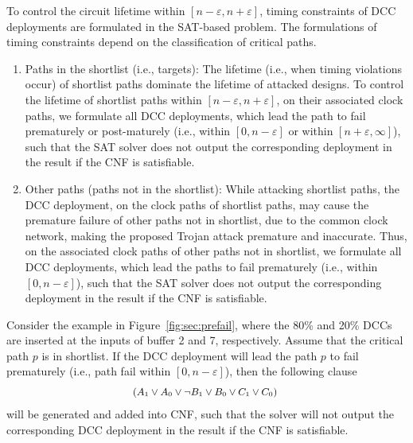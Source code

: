 To control the circuit lifetime within $[n - \varepsilon, n + \varepsilon]$, timing constraints of DCC deployments are formulated in the SAT-based problem. The formulations of timing constraints depend on the classification of critical paths.
\begin{enumerate}
	\item Paths in the shortlist (i.e., targets): The lifetime (i.e., when timing violations occur) of shortlist paths dominate the lifetime of attacked designs. To control the lifetime of shortlist paths within $[n - \varepsilon, n + \varepsilon]$, on their associated clock paths, we formulate all DCC deployments, which lead the path to fail prematurely or post-maturely (i.e., within $[ 0, n - \varepsilon]$ or within $[ n + \varepsilon, \infty]$), such that the SAT solver does not output the corresponding deployment in the result if the CNF is satisfiable.
	\item Other paths (paths not in the shortlist): While attacking shortlist paths, the DCC deployment, on the clock paths of shortlist paths, may cause the premature failure of other paths not in shortlist, due to the common clock network, making the proposed Trojan attack premature and inaccurate. Thus, on the associated clock paths of other paths not in shortlist, we formulate all DCC deployments,  which lead the paths to fail prematurely (i.e., within $[ 0, n - \varepsilon]$), such that the SAT solver does not output the corresponding deployment in the result if the CNF is satisfiable.
\end{enumerate}

Consider the example in Figure~\ref{fig:sec:prefail}, where the 80\% and 20\% DCCs are inserted at the inputs of buffer 2 and 7, respectively. Assume that the critical path $p$ is in shortlist. If the DCC deployment will lead the path $p$ to fail prematurely (i.e., path fail within $[ 0, n - \varepsilon]$), then the following clause
\begin{gather*}
	\fontsize{9}{7} \selectfont
	\mbox{($A_{1} \lor A_{0} \lor \neg B_{1} \lor B_{0} \lor C_{1} \lor C_{0}$) } 
\end{gather*}
will be generated and added into CNF, such that the solver will not output the corresponding DCC deployment in the result if the CNF is satisfiable.

